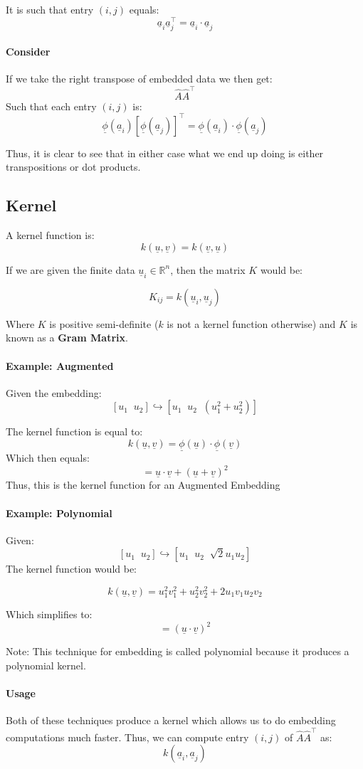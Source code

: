 \documentclass[12pt]{book}
\newcommand{\und}{%
        \underline
}
\begin{document}
It is such that entry $(i,j)$ equals:
\[\und a_i \und a_j^\top = \und a_i \cdot \und a_j\]

\paragraph{Consider}
If we take the right transpose of embedded data we then get:
\[\hat A\hat A^\top\]
Such that each entry $(i,j)$ is:
\[\und \phi(\und a_i)[\und \phi(\und a_j)]^\top = \und \phi(\und a_i) \cdot \und \phi(\und a_j)\]

Thus, it is clear to see that in either case what we end up doing is either
transpositions or dot products.

\subsection*{Kernel}
A kernel function is:
\[k(\und u, \und v) = k(\und v, \und u)\]

If we are given the finite data $\und u_i \in \mathbb{R}^n $, then
the matrix $K$ would be:

\[K_{ij} = k(\und u_i, \und u_j)\]

Where $K$ is positive semi-definite ($k$ is not a kernel function otherwise)
and $K$ is known as a \textbf{Gram Matrix}.
\paragraph{Example: Augmented}
Given the embedding:
\[[u_1\;\;u_2] \hookrightarrow [u_1\;\;u_2\;\;(u_1^2 + u_2^2)]\]

The kernel function is equal to:
\[k(\und u, \und v) = \und \phi(\und u)\cdot\und\phi(\und v)\]
Which then equals:
\[= \und u \cdot \und v + (\und u + \und v)^2\]
Thus, this is the kernel function for an Augmented Embedding

\paragraph{Example: Polynomial}
Given: 
\[[u_1\;\;u_2] \hookrightarrow [u_1\;\;u_2\;\;\sqrt2 u_1u_2]\]
The kernel function would be:

\[k(\und u, \und v) = u_1^2v_1^2 + u_2^2v_2^2 + 2u_1v_1u_2v_2\]

Which simplifies to:
\[=(\und u \cdot \und v)^2\]

Note: This technique for embedding is called polynomial because it 
produces a polynomial kernel.

\paragraph*{Usage}
Both of these techniques produce a kernel which allows us to do embedding 
computations much faster. Thus, we can compute entry $(i,j)$ of
$\hat A\hat A^\top$ as:
\[k(\und a_i, \und a_j)\]
\end{document}
